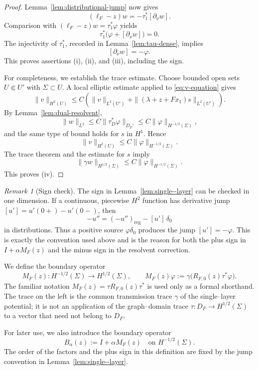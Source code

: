 \documentclass[a4paper,11pt]{article}
\numberwithin{equation}{section}
\theoremstyle{remark}
\newtheorem{rem}[lem]{Remark}
\theoremstyle{definition}
\theoremstyle{remark}
\begin{document}
\begin{proof}
Lemma~\ref{lem:distributional-jump} now gives
$$
(\ell_F-z)w=-\tau_1^*[\partial_\nu w].
$$
Comparison with $(\ell_F-z)w=\tau_1^*\varphi$ yields
$$
\tau_1^*\bigl(\varphi+[\partial_\nu w]\bigr)=0.
$$
The injectivity of $\tau_1^*$, recorded in Lemma~\ref{lem:tau-dense}, implies
$$
[\partial_\nu w]=-\varphi.
$$
This proves assertions (i), (ii), and (iii), including the sign.

For completeness, we establish the trace estimate.
Choose bounded open sets $U\Subset U'$ with $\Sigma\subset U$.
A local elliptic estimate applied to \eqref{eq:v-equation} gives
$$
\|v\|_{H^2(U)}
\le C\left(
\|v\|_{L^2(U')}
+\|(\lambda+z+Fx_1)s\|_{L^2(U')}
\right).
$$
By Lemma~\ref{lem:dual-resolvent},
$$
\|w\|_{L^2}
\le C\|\tau_D^*\varphi\|_{D_F'}
\le C\|\varphi\|_{H^{-1/2}(\Sigma)},
$$
and the same type of bound holds for $s$ in $H^1$.
Hence
$$
\|v\|_{H^2(U)}
\le C\|\varphi\|_{H^{-1/2}(\Sigma)}.
$$
The trace theorem and the estimate for $s$ imply
$$
\|\gamma w\|_{H^{1/2}(\Sigma)}
\le C\|\varphi\|_{H^{-1/2}(\Sigma)}.
$$
This proves (iv).
\end{proof}

\begin{rem}[Sign check]\label{rem:sign-check}
The sign in Lemma~\ref{lem:single--layer} can be checked in one dimension.
If a continuous, piecewise $H^2$ function has derivative jump $[u']=u'(0+)-u'(0-)$, then
$$
-u''=(-u'')_{\mathrm{reg}}-[u']\,\delta_0
$$
in distributions.
Thus a positive source $\varphi\delta_0$ produces the jump $[u']=-\varphi$.
This is exactly the convention used above and is the reason for both the plus sign in $I+\alpha M_F(z)$ and the minus sign in the resolvent correction.
\end{rem}

We define the boundary operator
$$
M_F(z):H^{-1/2}(\Sigma)\to H^{1/2}(\Sigma),
\qquad
M_F(z)\varphi
:=\gamma\bigl(R_{F,0}(z)\tau^*\varphi\bigr).
$$
The familiar notation $M_F(z)=\tau R_{F,0}(z)\tau^*$ is used only as a formal shorthand.
The trace on the left is the common transmission trace $\gamma$ of the single--layer potential; it is not an application of the graph--domain trace $\tau:D_F\to H^{1/2}(\Sigma)$ to a vector that need not belong to $D_F$.

For later use, we also introduce the boundary operator
\begin{equation}\label{eq:B-alpha}
B_\alpha(z):=I+\alpha M_F(z)
\quad\text{on }H^{-1/2}(\Sigma).
\end{equation}
The order of the factors and the plus sign in this definition are fixed by the jump convention in Lemma~\ref{lem:single--layer}.
\end{document}
